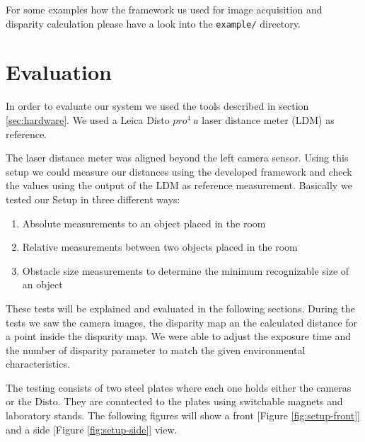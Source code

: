 \documentclass[11pt]{article}
\begin{document}
\bigskip
For some examples how the framework us used for image acquisition and disparity calculation please have a look into the \texttt{example/} directory. %


\section{Evaluation}
In order to evaluate our system we used the tools described in section \ref{sec:hardware}. We used a Leica Disto $pro^4\ a$ laser distance meter (LDM) as reference. 

The laser distance meter was aligned beyond the left camera sensor. Using this setup we could measure our distances using the developed framework and check the values using the output of the LDM as reference measurement. Basically we tested our Setup in three different ways:

\begin{enumerate}
  \item Absolute measurements to an object placed in the room
  \item Relative measurements between two objects placed in the room
  \item Obstacle size measurements to determine the minimum recognizable size of an object
\end{enumerate}

These tests will be explained and evaluated in the following sections. During the tests we saw the camera images, the disparity map an the calculated distance for a point inside the disparity map. We were able to adjust the exposure time and the number of disparity parameter to match the given environmental characteristics.

The testing consists of two steel plates where each one holds either the cameras or the Disto. They are conntected to the plates using switchable magnets and laboratory stands. The following figures will show a front [Figure \ref{fig:setup-front}] and a side [Figure \ref{fig:setup-side}] view.
\end{document}
